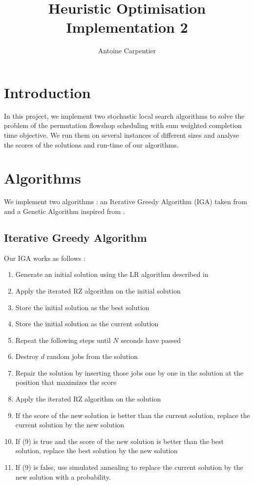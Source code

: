 \documentclass[a4paper,10pt]{article}
\title{Heuristic Optimisation\\Implementation 2}
\author{Antoine Carpentier}
\begin{document}
\maketitle

\section{Introduction}

In this project, we implement two stochastic local search algorithms to solve the problem of the permutation flowshop scheduling with sum weighted completion time objective. We run them on several instances of different sizes and analyse the scores of the solutions and run-time of our algorithms.

\section{Algorithms}

We implement two algorithms : an Iterative Greedy Algorithm (IGA) taken from \cite{panruiz2012} and a Genetic Algorithm inspired from \cite{tseng2010genetic}.

	\subsection{Iterative Greedy Algorithm}

	Our IGA works as follows : 

	\begin{enumerate}
		\item Generate an initial solution using the LR algorithm described in \cite{liu2001constructive}
		\item Apply the iterated RZ algorithm on the initial solution
		\item Store the initial solution as the best solution
		\item Store the initial solution as the current solution
		\item Repeat the following steps until $N$ seconds have passed
		\item Destroy $d$ random jobs from the solution
		\item Repair the solution by inserting those jobs one by one in the solution at the position that maximizes the score
		\item Apply the iterated RZ algorithm on the solution
		\item If the score of the new solution is better than the current solution, replace the current solution by the new solution
		\item If (9) is true and the score of the new solution is better than the best solution, replace the best solution by the new solution
		\item If (9) is false, use simulated annealing to replace the current solution by the new solution with a probability.
	\end{enumerate}
\end{document}
